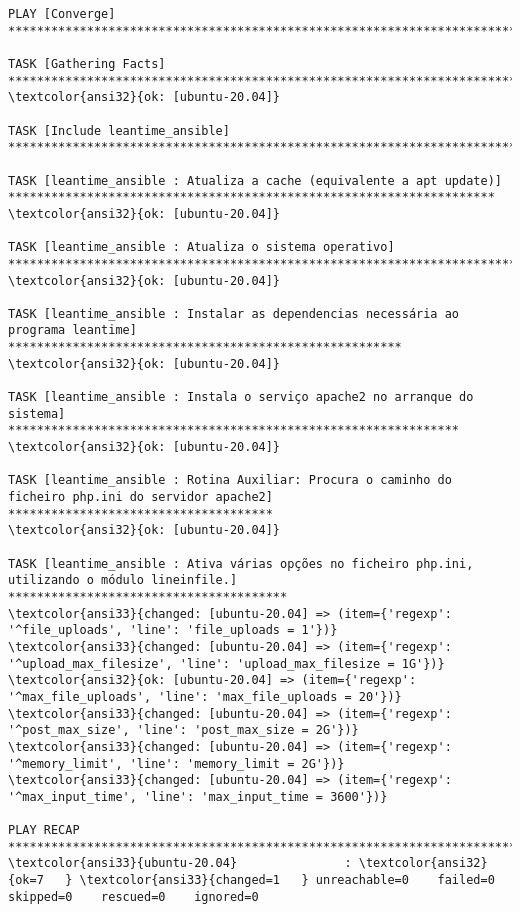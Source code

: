 \documentclass{scrartcl}
\begin{document}
\begin{Verbatim}
PLAY [Converge] **************************************************************************************************************************

TASK [Gathering Facts] *******************************************************************************************************************
\textcolor{ansi32}{ok: [ubuntu-20.04]}

TASK [Include leantime_ansible] **********************************************************************************************************

TASK [leantime_ansible : Atualiza a cache (equivalente a apt update)] ********************************************************************
\textcolor{ansi32}{ok: [ubuntu-20.04]}

TASK [leantime_ansible : Atualiza o sistema operativo] ***********************************************************************************
\textcolor{ansi32}{ok: [ubuntu-20.04]}

TASK [leantime_ansible : Instalar as dependencias necessária ao programa leantime] *******************************************************
\textcolor{ansi32}{ok: [ubuntu-20.04]}

TASK [leantime_ansible : Instala o serviço apache2 no arranque do sistema] ***************************************************************
\textcolor{ansi32}{ok: [ubuntu-20.04]}

TASK [leantime_ansible : Rotina Auxiliar: Procura o caminho do ficheiro php.ini do servidor apache2] *************************************
\textcolor{ansi32}{ok: [ubuntu-20.04]}

TASK [leantime_ansible : Ativa várias opções no ficheiro php.ini, utilizando o módulo lineinfile.] ***************************************
\textcolor{ansi33}{changed: [ubuntu-20.04] => (item={'regexp': '^file_uploads', 'line': 'file_uploads = 1'})}
\textcolor{ansi33}{changed: [ubuntu-20.04] => (item={'regexp': '^upload_max_filesize', 'line': 'upload_max_filesize = 1G'})}
\textcolor{ansi32}{ok: [ubuntu-20.04] => (item={'regexp': '^max_file_uploads', 'line': 'max_file_uploads = 20'})}
\textcolor{ansi33}{changed: [ubuntu-20.04] => (item={'regexp': '^post_max_size', 'line': 'post_max_size = 2G'})}
\textcolor{ansi33}{changed: [ubuntu-20.04] => (item={'regexp': '^memory_limit', 'line': 'memory_limit = 2G'})}
\textcolor{ansi33}{changed: [ubuntu-20.04] => (item={'regexp': '^max_input_time', 'line': 'max_input_time = 3600'})}

PLAY RECAP *******************************************************************************************************************************
\textcolor{ansi33}{ubuntu-20.04}               : \textcolor{ansi32}{ok=7   } \textcolor{ansi33}{changed=1   } unreachable=0    failed=0    skipped=0    rescued=0    ignored=0


\end{Verbatim}
\end{document}
